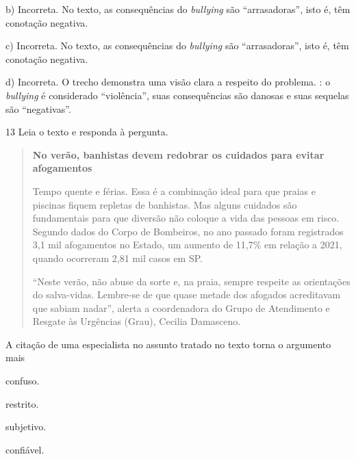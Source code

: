 \begin{escolha}
\begin{escolha}
\begin{escolha}
{b) Incorreta. No texto, as consequências do \textit{bullying} são 
``arrasadoras'', isto é, têm conotação negativa.

c) Incorreta. No texto, as consequências do \textit{bullying} são 
``arrasadoras'', isto é, têm conotação negativa.

d) Incorreta. O trecho demonstra uma visão clara a respeito do
problema. : o \textit{bullying} é considerado ``violência'',
suas consequências são danosas e suas sequelas são ``negativas''.}

\num{13} Leia o texto e responda à pergunta.

\begin{quote}
\textbf{No verão, banhistas devem redobrar os cuidados para evitar
afogamentos}

Tempo quente e férias. Essa é a combinação ideal para que praias e
piscinas fiquem repletas de banhistas. Mas alguns cuidados são
fundamentais para que diversão não coloque a vida das pessoas em risco.
Segundo dados do Corpo de Bombeiros, no ano passado foram registrados
3,1 mil afogamentos no Estado, um aumento de 11,7\% em relação a 2021,
quando ocorreram 2,81 mil casos em SP.

``Neste verão, não abuse da sorte e, na praia, sempre respeite as
orientações do salva-vidas. Lembre-se de que quase metade dos afogados
acreditavam que sabiam nadar'', alerta a coordenadora do Grupo de
Atendimento e Resgate às Urgências (Grau), Cecilia Damasceno.
\end{quote}


A citação de uma especialista no assunto tratado no texto torna o
argumento mais

\begin{escolha}
  \item confuso.

  \item restrito.

  \item subjetivo.

  \item confiável.
\end{escolha}

\end{escolha}
\end{escolha}
\end{escolha}
